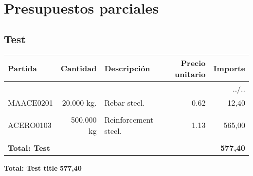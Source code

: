 \documentclass{book}%
\begin{document}
%
\normalsize%
\part{Presupuestos parciales}%
\label{sec:Presupuestosparciales}%
\chapter{Test}%
\label{sec:Test}%
\small%
\begin{longtable}{lrlrr}%
Partida&Cantidad&Descripción&\multicolumn{1}{p{1.5cm}}{Precio unitario}&Importe\\%
\hline%
\endhead%
\multicolumn{5}{r}{../..}\\%
\endfoot%
\endlastfoot%
MAACE0201&20.000 kg.&\multicolumn{1}{p{5cm}}{Rebar steel.}&0.62&12,40\\%
&&&&\\%
ACERO0103&500.000 kg&\multicolumn{1}{p{5cm}}{Reinforcement steel.}&1.13&565,00\\%
&&&&\\%
\multicolumn{4}{p{8cm}}{\textbf{Total: Test}}&\textbf{577,40}\\%
\end{longtable}%
\normalsize

%
\noindent%
\large%
\textbf{Total: Test title }%
\dotfill%
\textbf{577,40}%
\newline%
\normalsize

%
\end{document}
